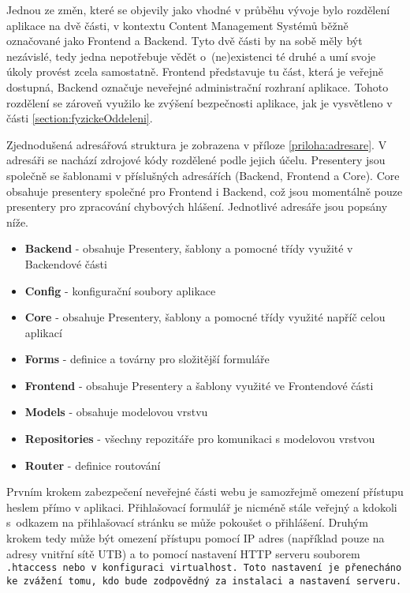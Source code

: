 Jednou ze změn, které se objevily jako vhodné v průběhu vývoje bylo rozdělení aplikace na dvě části, v kontextu Content Management Systémů běžně označované jako Frontend a Backend. Tyto dvě části by na sobě měly být nezávislé, tedy jedna nepotřebuje vědět o~(ne)existenci té druhé a umí svoje úkoly provést zcela samostatně. Frontend představuje tu část, která je veřejně dostupná, Backend označuje neveřejné administrační rozhraní aplikace. Tohoto rozdělení se zároveň využilo ke zvýšení bezpečnosti aplikace, jak je vysvětleno v části \ref{section:fyzickeOddeleni}.

Zjednodušená adresářová struktura je zobrazena v příloze \ref{priloha:adresare}. V adresáři  se nachází zdrojové kódy rozdělené podle jejich účelu. Presentery jsou společně se šablonami v příslušných adresářích (Backend, Frontend a Core). Core obsahuje presentery společné pro Frontend i Backend, což jsou momentálně pouze presentery pro zpracování chybových hlášení. Jednotlivé adresáře jsou popsány níže.
\begin{itemize}
	\item  \textbf{Backend} - obsahuje Presentery, šablony a pomocné třídy využité v Backendové části
	\item \textbf{Config} - konfigurační soubory aplikace
	\item \textbf{Core} - obsahuje Presentery, šablony a pomocné třídy využité napříč celou aplikací
	\item \textbf{Forms} - definice a továrny pro složitější formuláře
	\item \textbf{Frontend} - obsahuje Presentery a šablony využité ve Frontendové části
	\item \textbf{Models} - obsahuje modelovou vrstvu
	\item \textbf{Repositories} - všechny repozitáře pro komunikaci s modelovou vrstvou
	\item \textbf{Router} - definice routování
\end{itemize}

 \label{section:fyzickeOddeleni}
Prvním krokem zabezpečení neveřejné části webu je samozřejmě omezení přístupu heslem přímo v aplikaci. Přihlašovací formulář je nicméně stále veřejný a kdokoli s~odkazem na přihlašovací stránku se může pokoušet o přihlášení. Druhým krokem tedy může být omezení přístupu pomocí IP adres (například pouze na adresy vnitřní sítě UTB) a to pomocí nastavení HTTP serveru souborem \tt{.htaccess} nebo v~konfiguraci \tt{virtualhost}. Toto nastavení je přenecháno ke zvážení tomu, kdo bude zodpovědný za instalaci a nastavení serveru.

